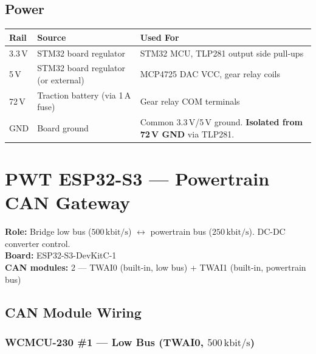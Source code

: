 \documentclass[12pt,a4paper,oneside]{report}
\newcommand{\bitrate}[1]{\ensuremath{#1\,\text{kbit/s}}}
\begin{document}
\section{Power}

\begin{center}
\begin{tabular}{lll}
\toprule
\textbf{Rail} & \textbf{Source} & \textbf{Used For} \\
\midrule
3.3\,V & STM32 board regulator & STM32 MCU, TLP281 output side pull-ups \\
5\,V   & STM32 board regulator (or external) & MCP4725 DAC VCC, gear relay coils \\
72\,V  & Traction battery (via 1\,A fuse) & Gear relay COM terminals \\
GND    & Board ground & Common 3.3\,V/5\,V ground. \textbf{Isolated from 72\,V GND} via TLP281. \\
\bottomrule
\end{tabular}
\end{center}


\chapter{PWT ESP32-S3 --- Powertrain CAN Gateway}

\textbf{Role:} Bridge low bus (\bitrate{500}) $\leftrightarrow$ powertrain bus (\bitrate{250}). DC-DC converter control.\\
\textbf{Board:} ESP32-S3-DevKitC-1\\
\textbf{CAN modules:} 2 --- TWAI0 (built-in, low bus) + TWAI1 (built-in, powertrain bus)

\section{CAN Module Wiring}

\subsection{WCMCU-230 \#1 --- Low Bus (TWAI0, \bitrate{500})}
\end{document}
